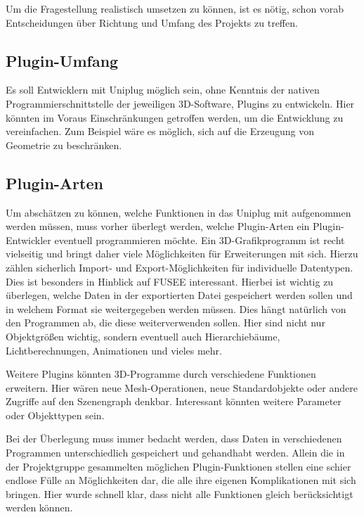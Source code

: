  \label{sec:Vorueberlegungen}

Um die Fragestellung realistisch umsetzen zu können, ist es nötig, schon vorab Entscheidungen über Richtung und Umfang des Projekts zu treffen.

\subsection{Plugin-Umfang}
Es soll Entwicklern mit Uniplug möglich sein, ohne Kenntnis der nativen Programmierschnittstelle der jeweiligen 3D-Software, Plugins zu entwickeln. Hier könnten im Voraus Einschränkungen getroffen werden, um die Entwicklung zu vereinfachen. Zum Beispiel wäre es möglich, sich auf die Erzeugung von Geometrie zu beschränken.

\subsection{Plugin-Arten}
Um abschätzen zu können, welche Funktionen in das Uniplug mit aufgenommen werden müssen, muss vorher überlegt werden, welche Plugin-Arten ein Plugin-Entwickler eventuell programmieren möchte. Ein 3D-Grafikprogramm ist recht vielseitig und bringt daher viele Möglichkeiten für Erweiterungen mit sich. Hierzu zählen sicherlich Import- und Export-Möglichkeiten für individuelle Datentypen. Dies ist besonders in Hinblick auf FUSEE interessant. Hierbei ist wichtig zu überlegen, welche Daten in der exportierten Datei gespeichert werden sollen und in welchem Format sie weitergegeben werden müssen. Dies hängt natürlich von den Programmen ab, die diese weiterverwenden sollen. Hier sind nicht nur Objektgrößen wichtig, sondern eventuell auch Hierarchiebäume, Lichtberechnungen, Animationen und vieles mehr.

Weitere Plugins könnten 3D-Programme durch verschiedene Funktionen erweitern. Hier wären neue Mesh-Operationen, neue Standardobjekte oder andere Zugriffe auf den Szenengraph denkbar. Interessant könnten weitere Parameter oder Objekttypen sein.

Bei der Überlegung muss immer bedacht werden, dass Daten in verschiedenen Programmen unterschiedlich gespeichert und gehandhabt werden. Allein die in der Projektgruppe gesammelten möglichen Plugin-Funktionen stellen eine schier endlose Fülle an Möglichkeiten dar, die alle ihre eigenen Komplikationen mit sich bringen. Hier wurde schnell klar, dass nicht alle Funktionen gleich berücksichtigt werden können.
 
